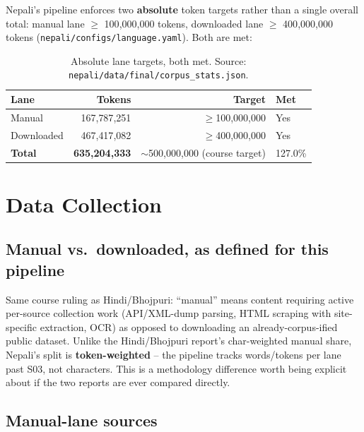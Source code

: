 \documentclass[11pt]{article}
\begin{document}
Nepali's pipeline enforces two \textbf{absolute} token targets rather than
a single overall total: manual lane $\geq$ 100{,}000{,}000 tokens,
downloaded lane $\geq$ 400{,}000{,}000 tokens
(\texttt{nepali/configs/language.yaml}). Both are met:

\begin{table}[htbp]
\centering
\begin{tabular}{lrrl}
\toprule
Lane & Tokens & Target & Met \\
\midrule
Manual & 167{,}787{,}251 & $\geq$100{,}000{,}000 & Yes \\
Downloaded & 467{,}417{,}082 & $\geq$400{,}000{,}000 & Yes \\
\textbf{Total} & \textbf{635{,}204{,}333} & $\sim$500{,}000{,}000 (course target) & 127.0\% \\
\bottomrule
\end{tabular}
\caption{Absolute lane targets, both met. Source: \texttt{nepali/data/final/corpus\_stats.json}.}
\end{table}

\section{Data Collection}

\subsection*{Manual vs.\ downloaded, as defined for this pipeline}

Same course ruling as Hindi/Bhojpuri: ``manual'' means content requiring
active per-source collection work (API/XML-dump parsing, HTML scraping
with site-specific extraction, OCR) as opposed to downloading an
already-corpus-ified public dataset. Unlike the Hindi/Bhojpuri report's
char-weighted manual share, Nepali's split is \textbf{token-weighted} --
the pipeline tracks words/tokens per lane past S03, not characters. This
is a methodology difference worth being explicit about if the two reports
are ever compared directly.

\subsection*{Manual-lane sources}
\end{document}

